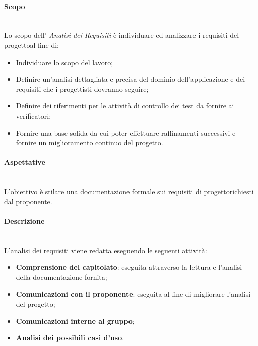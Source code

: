 \paragraph*{Scopo}\mbox{}\\ [1mm] 
Lo scopo dell' \textit{Analisi dei Requisiti} è individuare ed analizzare i requisiti del progetto\glosp al fine di:
\begin{itemize}
	\item Individuare lo scopo del lavoro;
	\item Definire un'analisi dettagliata e precisa del dominio dell'applicazione e dei requisiti che i progettisti dovranno seguire;
	\item Definire dei riferimenti per le attività di controllo dei test da fornire ai verificatori;
	\item Fornire una base solida da cui poter effettuare raffinamenti successivi e fornire un miglioramento continuo del progetto\glo.
\end{itemize}
\paragraph*{Aspettative}\mbox{}\\ [1mm]
L'obiettivo è stilare una documentazione formale sui requisiti di progetto\glosp richiesti dal proponente.
\paragraph*{Descrizione}\mbox{}\\ [1mm]
L'analisi dei requisiti viene redatta eseguendo le seguenti attività:
\begin{itemize}
	\item \textbf{Comprensione del capitolato}\glo: eseguita attraverso la lettura e l'analisi della documentazione fornita;
	\item \textbf{Comunicazioni con il proponente}: eseguita al fine di migliorare l'analisi del progetto\glo;
	\item \textbf{Comunicazioni interne al gruppo};
	\item \textbf{Analisi dei possibili casi d'uso\glo}.
\end{itemize}
